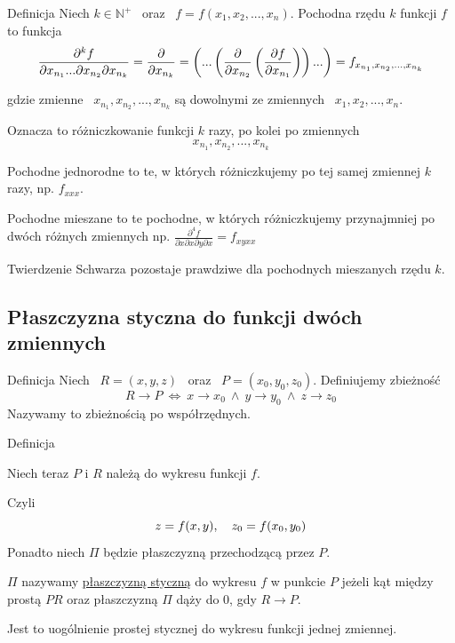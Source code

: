 \begin{tw}{Definicja}
Niech $k \in \mathbb{N}^+$ \ oraz \ $ f = f(x_1, x_2, ..., x_n) $. Pochodna rzędu $k$ funkcji $f$ to funkcja
\[ \frac{\partial^k f}{\partial x_{n_1}... \partial x_{n_2} \partial x_{n_k}} = \frac{\partial }{\partial x_{n_k}}
= \left( ... \left( \frac{\partial }{\partial x_{n_2}} \left( \frac{\partial f}{\partial x_{n_1}} \right) \right) ... \right) = f_{x_{n_1}, x_{n_2}, ..., x_{n_k}} \]

gdzie zmienne \ $ x_{n_1}, x_{n_2}, ..., x_{n_k} $ są dowolnymi ze zmiennych \ $x_1, x_2, ..., x_n$. \bigskip

Oznacza to różniczkowanie funkcji $k$ razy, po kolei po zmiennych
\[ x_{n_1}, x_{n_2}, ..., x_{n_k} \]

\end{tw}

Pochodne jednorodne to te, w których różniczkujemy po tej samej zmiennej $k$ razy, np. $f_{xxx}$.

Pochodne mieszane to te pochodne, w których różniczkujemy przynajmniej po dwóch różnych zmiennych np. $ \frac{\partial^4 f}{\partial x \partial x \partial y \partial x} = f_{xyxx} $

Twierdzenie Schwarza pozostaje prawdziwe dla pochodnych mieszanych rzędu $k$.

\subsection*{Płaszczyzna styczna do funkcji dwóch zmiennych}

\begin{tw}{Definicja}
Niech \ $ R = (x,y,z) $ \ oraz \ $ P = (x_0, y_0, z_0) $. Definiujemy zbieżność
\[ R \to P \ \Leftrightarrow \ x \to x_0 \ \land \ y \to y_0 \ \land \ z \to z_0 \]
Nazywamy to zbieżnością po współrzędnych.

\end{tw}

\begin{tw}{Definicja}

Niech teraz $P$ i $R$ należą do wykresu funkcji $f$. 

Czyli 
\[ z = f(x,y), \quad z_0 = f(x_0, y_0) \]
Ponadto niech $ \Pi $ będzie płaszczyzną przechodzącą przez $P$.

$\Pi$ nazywamy \underline{płaszczyzną styczną} do wykresu $f$ w punkcie $P$ jeżeli kąt między prostą $PR$ oraz płaszczyzną $\Pi$ dąży do 0, gdy $R \to P$.

Jest to uogólnienie prostej stycznej do wykresu funkcji jednej zmiennej.
\end{tw}

